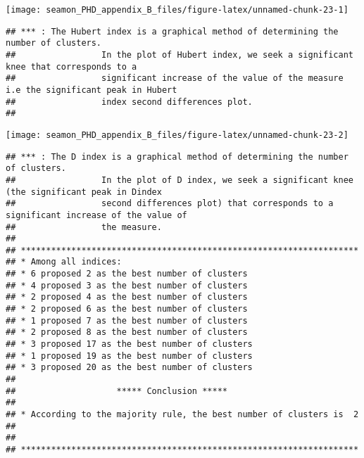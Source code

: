 \documentclass[]{article}
\begin{document}
\texttt{[image: seamon\_PHD\_appendix\_B\_files/figure-latex/unnamed-chunk-23-1]}

\begin{verbatim}
## *** : The Hubert index is a graphical method of determining the number of clusters.
##                 In the plot of Hubert index, we seek a significant knee that corresponds to a 
##                 significant increase of the value of the measure i.e the significant peak in Hubert
##                 index second differences plot. 
## 
\end{verbatim}

\texttt{[image: seamon\_PHD\_appendix\_B\_files/figure-latex/unnamed-chunk-23-2]}

\begin{verbatim}
## *** : The D index is a graphical method of determining the number of clusters. 
##                 In the plot of D index, we seek a significant knee (the significant peak in Dindex
##                 second differences plot) that corresponds to a significant increase of the value of
##                 the measure. 
##  
## ******************************************************************* 
## * Among all indices:                                                
## * 6 proposed 2 as the best number of clusters 
## * 4 proposed 3 as the best number of clusters 
## * 2 proposed 4 as the best number of clusters 
## * 2 proposed 6 as the best number of clusters 
## * 1 proposed 7 as the best number of clusters 
## * 2 proposed 8 as the best number of clusters 
## * 3 proposed 17 as the best number of clusters 
## * 1 proposed 19 as the best number of clusters 
## * 3 proposed 20 as the best number of clusters 
## 
##                    ***** Conclusion *****                            
##  
## * According to the majority rule, the best number of clusters is  2 
##  
##  
## *******************************************************************
\end{verbatim}
\end{document}
